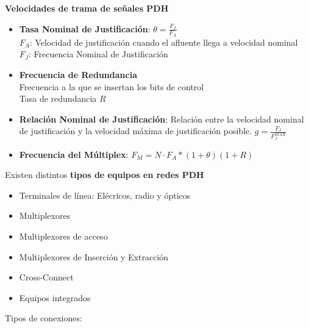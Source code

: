 \documentclass[10pt,portrait, twocolumn]{article}
\begin{document}
\textbf{Velocidades de trama de señales PDH}

	\begin{itemize}
		\item \textbf{Tasa Nominal de Justificación}: $\theta = \frac{F_{J}}{F_{A}}$\\
				\quad $F_{A}$: Velocidad de justificación cuando el afluente llega a velocidad nominal\\
				\quad $F_{J}$: Frecuencia Nominal de Justificación
		\item \textbf{Frecuencia de Redundancia}\\
			\quad Frecuencia a la que se insertan los bits de control \\
			\quad Tasa de redundancia $R$
		\item \textbf{Relación Nominal de Justificación}: Relación entre la velocidad nominal de justificación  y la velocidad máxima de justificación posible. $g = \frac{F_{J}}{F_{J}^{MAX}}$
		\item \textbf{Frecuencia del Múltiplex}: $F_{M} = N \cdot F_{A} * (1 + \theta) (1 + R)$
	\end{itemize}


Existen distintos \textbf{tipos de equipos en redes PDH}

	\begin{itemize}
		\item Terminales de línea: Elécricos, radio y ópticos
		\item Multiplexores
		\item Multiplexores de acceso
		\item Multiplexores de Inserción y Extracción
		\item Cross-Connect
		\item Equipos integrados
	\end{itemize}

Tipos de conexiones:
\end{document}
